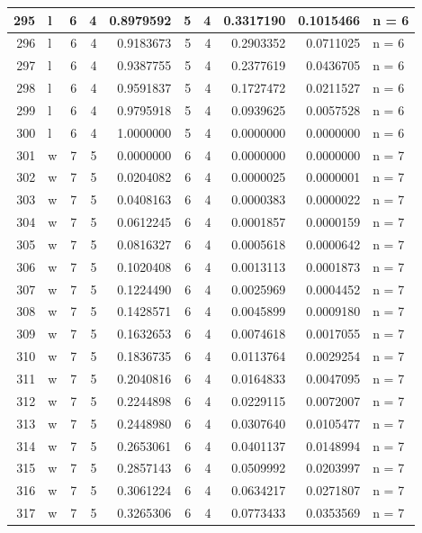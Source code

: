 \documentclass[
  letterpaper,
  DIV=11,
  numbers=noendperiod]{scrreprt}
\begin{document}
\begin{table}
\begin{tabular}[t]{r|l|r|r|r|r|r|r|r|l}
\hline
295 & l & 6 & 4 & 0.8979592 & 5 & 4 & 0.3317190 & 0.1015466 & n = 6\\
\hline
296 & l & 6 & 4 & 0.9183673 & 5 & 4 & 0.2903352 & 0.0711025 & n = 6\\
\hline
297 & l & 6 & 4 & 0.9387755 & 5 & 4 & 0.2377619 & 0.0436705 & n = 6\\
\hline
298 & l & 6 & 4 & 0.9591837 & 5 & 4 & 0.1727472 & 0.0211527 & n = 6\\
\hline
299 & l & 6 & 4 & 0.9795918 & 5 & 4 & 0.0939625 & 0.0057528 & n = 6\\
\hline
300 & l & 6 & 4 & 1.0000000 & 5 & 4 & 0.0000000 & 0.0000000 & n = 6\\
\hline
301 & w & 7 & 5 & 0.0000000 & 6 & 4 & 0.0000000 & 0.0000000 & n = 7\\
\hline
302 & w & 7 & 5 & 0.0204082 & 6 & 4 & 0.0000025 & 0.0000001 & n = 7\\
\hline
303 & w & 7 & 5 & 0.0408163 & 6 & 4 & 0.0000383 & 0.0000022 & n = 7\\
\hline
304 & w & 7 & 5 & 0.0612245 & 6 & 4 & 0.0001857 & 0.0000159 & n = 7\\
\hline
305 & w & 7 & 5 & 0.0816327 & 6 & 4 & 0.0005618 & 0.0000642 & n = 7\\
\hline
306 & w & 7 & 5 & 0.1020408 & 6 & 4 & 0.0013113 & 0.0001873 & n = 7\\
\hline
307 & w & 7 & 5 & 0.1224490 & 6 & 4 & 0.0025969 & 0.0004452 & n = 7\\
\hline
308 & w & 7 & 5 & 0.1428571 & 6 & 4 & 0.0045899 & 0.0009180 & n = 7\\
\hline
309 & w & 7 & 5 & 0.1632653 & 6 & 4 & 0.0074618 & 0.0017055 & n = 7\\
\hline
310 & w & 7 & 5 & 0.1836735 & 6 & 4 & 0.0113764 & 0.0029254 & n = 7\\
\hline
311 & w & 7 & 5 & 0.2040816 & 6 & 4 & 0.0164833 & 0.0047095 & n = 7\\
\hline
312 & w & 7 & 5 & 0.2244898 & 6 & 4 & 0.0229115 & 0.0072007 & n = 7\\
\hline
313 & w & 7 & 5 & 0.2448980 & 6 & 4 & 0.0307640 & 0.0105477 & n = 7\\
\hline
314 & w & 7 & 5 & 0.2653061 & 6 & 4 & 0.0401137 & 0.0148994 & n = 7\\
\hline
315 & w & 7 & 5 & 0.2857143 & 6 & 4 & 0.0509992 & 0.0203997 & n = 7\\
\hline
316 & w & 7 & 5 & 0.3061224 & 6 & 4 & 0.0634217 & 0.0271807 & n = 7\\
\hline
317 & w & 7 & 5 & 0.3265306 & 6 & 4 & 0.0773433 & 0.0353569 & n = 7\\

\end{tabular}
\end{table}
\end{document}
